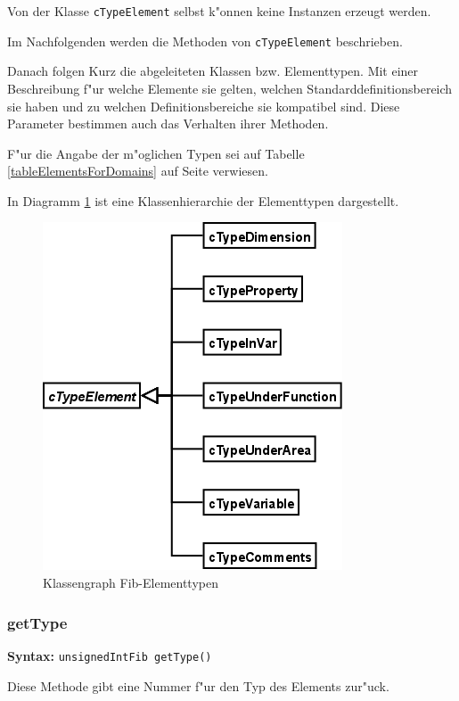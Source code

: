 Von der Klasse \verb|cTypeElement| selbst k"onnen keine Instanzen erzeugt werden.

Im Nachfolgenden werden die Methoden von \verb|cTypeElement| beschrieben.

Danach folgen Kurz die abgeleiteten Klassen bzw. Elementtypen. Mit einer Beschreibung f"ur welche Elemente sie gelten, welchen Standarddefinitionsbereich sie haben und zu welchen Definitionsbereiche sie kompatibel sind. Diese Parameter bestimmen auch das Verhalten ihrer Methoden.

F"ur die Angabe der m"oglichen Typen sei auf Tabelle \ref{tableElementsForDomains} auf Seite \pageref{tableElementsForDomains} verwiesen.

In Diagramm \ref{figClassFibElementtyps} ist eine Klassenhierarchie der Elementtypen dargestellt.

\begin{figure}[htbp]
\begin{center}
  \includegraphics[scale=0.4]{fib_element_typen}
\end{center}
\caption{Klassengraph Fib-Elementtypen}
\label{figClassFibElementtyps}
\end{figure}

\subsubsection{getType}

\textbf{Syntax:} \verb|unsignedIntFib getType()|

\bigskip\noindent
Diese Methode gibt eine Nummer f"ur den Typ des Elements zur"uck.

